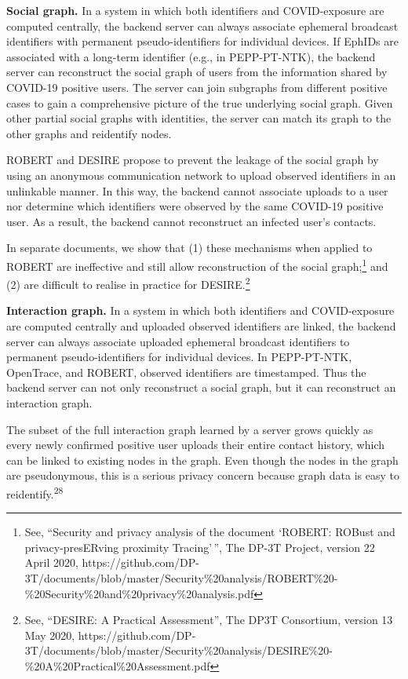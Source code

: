 \documentclass{article}
\begin{document}
\textbf{Social graph.} In a system in which both identifiers and
COVID-exposure are computed centrally, the backend server can always
associate ephemeral broadcast identifiers with permanent
pseudo-identifiers for individual devices. If EphIDs are associated with
a long-term identifier (e.g., in PEPP-PT-NTK), the backend server can
reconstruct the social graph of users from the information shared by
COVID-19 positive users. The server can join subgraphs from different
positive cases to gain a comprehensive picture of the true underlying
social graph. Given other partial social graphs with identities, the
server can match its graph to the other graphs and reidentify nodes.

ROBERT and DESIRE propose to prevent the leakage of the social graph by
using an anonymous communication network to upload observed identifiers
in an unlinkable manner. In this way, the backend cannot associate
uploads to a user nor determine which identifiers were observed by the
same COVID-19 positive user. As a result, the backend cannot reconstruct
an infected user's contacts.

In separate documents, we show that (1) these mechanisms when applied to
ROBERT are ineffective and still allow reconstruction of the social
graph;\footnote{See, ``Security and privacy analysis of the document
  `ROBERT: ROBust and privacy-presERving proximity Tracing'\,'', The
  DP-3T Project, version 22 April 2020,
  {https://github.com/DP-3T/documents/blob/master/Security\%20analysis/ROBERT\%20-\%20Security\%20and\%20privacy\%20analysis.pdf}}
and (2) are difficult to realise in practice for DESIRE.\footnote{See,
  ``DESIRE: A Practical Assessment'', The DP3T Consortium, version 13
  May 2020,
  {https://github.com/DP-3T/documents/blob/master/Security\%20analysis/DESIRE\%20-\%20A\%20Practical\%20Assessment.pdf}}

\textbf{Interaction graph.} In a system in which both identifiers and
COVID-exposure are computed centrally and uploaded observed identifiers
are linked, the backend server can always associate uploaded ephemeral
broadcast identifiers to permanent pseudo-identifiers for individual
devices. In PEPP-PT-NTK, OpenTrace, and ROBERT, observed identifiers are
timestamped. Thus the backend server can not only reconstruct a social
graph, but it can reconstruct an interaction graph.

The subset of the full interaction graph learned by a server grows
quickly as every newly confirmed positive user uploads their entire
contact history, which can be linked to existing nodes in the graph.
Even though the nodes in the graph are pseudonymous, this is a serious
privacy concern because graph data is easy to
reidentify.\textsuperscript{28}
\end{document}
